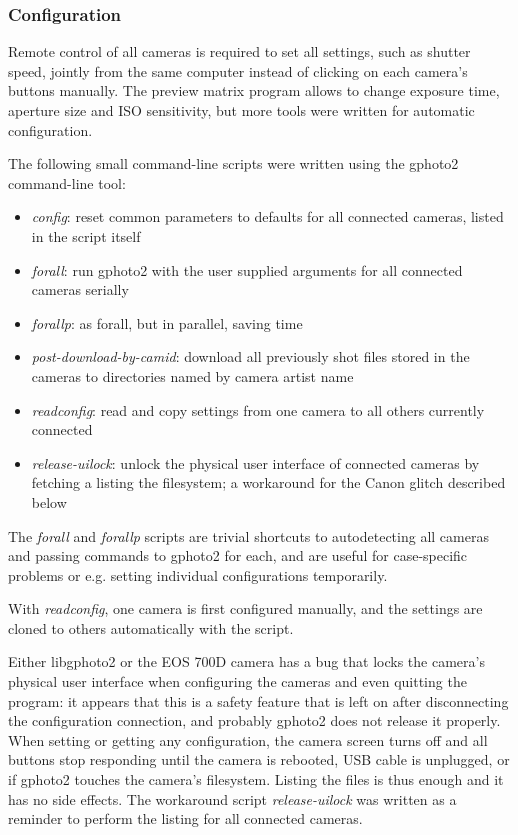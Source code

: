 
\subsubsection{Configuration} %

Remote control of all cameras is required to set all settings, such as shutter speed, jointly from the same computer instead of clicking on each camera's buttons manually.
The preview matrix program allows to change exposure time, aperture size and ISO sensitivity, but more tools were written for automatic configuration.

The following small command-line scripts were written using the gphoto2 command-line tool:

\begin{itemize}
	\item \emph{config}: reset common parameters to defaults for all connected cameras, listed in the script itself
	\item \emph{forall}: run gphoto2 with the user supplied arguments for all connected cameras serially
	\item \emph{forallp}: as forall, but in parallel, saving time
	\item \emph{post-download-by-camid}: download all previously shot files stored in the cameras to directories named by camera artist name
	\item \emph{readconfig}: read and copy settings from one camera to all others currently connected
	\item \emph{release-uilock}: unlock the physical user interface of connected cameras by fetching a listing the filesystem; a workaround for the Canon glitch described below
\end{itemize}

The \emph{forall} and \emph{forallp} scripts are trivial shortcuts to autodetecting all cameras and passing commands to gphoto2 for each, and are useful for case-specific problems or e.g. setting individual configurations temporarily.

With \emph{readconfig}, one camera is first configured manually, and the settings are cloned to others automatically with the script.

Either libgphoto2 or the EOS 700D camera has a bug that locks the camera's physical user interface when configuring the cameras and even quitting the program:
it appears that this is a safety feature that is left on after disconnecting the configuration connection, and probably gphoto2 does not release it properly.
When setting or getting any configuration, the camera screen turns off and all buttons stop responding until the camera is rebooted, USB cable is unplugged, or if gphoto2 touches the camera's filesystem.
Listing the files is thus enough and it has no side effects.
The workaround script \emph{release-uilock} was written as a reminder to perform the listing for all connected cameras.

